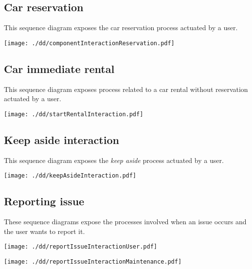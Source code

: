 \documentclass{scrreprt}
\begin{document}
\subsection{Car reservation}
This sequence diagram exposes the car reservation process actuated by a user.
\begin{center}
		\texttt{[image: ./dd/componentInteractionReservation.pdf]}
\end{center}

\subsection{Car immediate rental}
This sequence diagram exposes process related to a car rental without reservation actuated by a user.
\begin{center}
		\texttt{[image: ./dd/startRentalInteraction.pdf]}
\end{center}

\subsection{Keep aside interaction}
This sequence diagram exposes the \emph{keep aside} process actuated by a user.
\begin{center}
		\texttt{[image: ./dd/keepAsideInteraction.pdf]}
\end{center}

\subsection{Reporting issue}
These sequence diagrams expose the processes involved when an issue occurs and the user wants to report it.
\begin{center}
		\texttt{[image: ./dd/reportIssueInteractionUser.pdf]}
\end{center}
\begin{center}
		\texttt{[image: ./dd/reportIssueInteractionMaintenance.pdf]}
\end{center}
\end{document}

